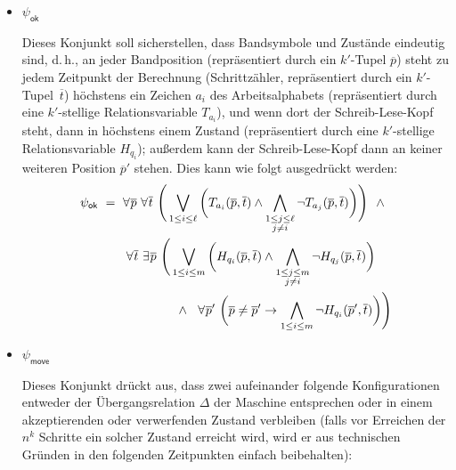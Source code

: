 \documentclass[fontsize=11pt, twoside=false, numbers=autoenddot]{scrbook}
\begin{document}
\begin{itemize}
  \item
    {\boldmath $\psi_{\textsf{ok}}$}
    \par
    Dieses Konjunkt soll sicherstellen,
    dass Bandsymbole und Zustände eindeutig sind, d.\,h.,
    an jeder Bandposition (repräsentiert durch ein $k'$-Tupel $\overline{p}$)
    steht zu jedem Zeitpunkt der Berechnung
    (Schrittzähler, repräsentiert durch ein $k'$-Tupel~$\overline{t}$)
    höchstens ein Zeichen $a_i$ des Arbeitsalphabets
    (repräsentiert durch eine $k'$-stellige Relationsvariable $T_{a_i}$),
    und wenn dort der Schreib-Lese-Kopf steht,
    dann in höchstens einem Zustand
    (repräsentiert durch eine $k'$-stellige Relationsvariable $H_{q_i}$);
    außerdem kann der Schreib-Lese-Kopf dann an keiner weiteren Position $\overline{p}'$ stehen.
    Dies kann wie folgt ausgedrückt werden:
    \begin{align*}
      \psi_{\textsf{ok}} & ~=~
      \forall\:\! \overline{p}~\forall\:\! \overline{t}~
      \Bigg(
        \bigvee_{1 \leq i \leq \ell} \bigg(
          T_{a_i}(\overline{p},\overline{t}) \land
          \bigwedge_{\substack{1 \leq j \leq \ell\\j \neq i}} \lnot T_{a_j}(\overline{p},\overline{t})
        \bigg)
      \Bigg)
      ~~\land \\
      & \hspace*{8mm}
      \forall\:\! \overline{t}~\exists\:\! \overline{p}~
      \Bigg(
        \bigvee_{1 \leq i \leq m} \bigg(
          H_{q_i}(\overline{p},\overline{t}) \land
          \bigwedge_{\substack{1 \leq j \leq m\\j \neq i}} \lnot H_{q_j}(\overline{p},\overline{t})
        \bigg)
      \\
      & \hspace*{22mm}
      \land~~ \forall\:\! \overline{p}'~
      \bigg(
        \overline{p} \neq \overline{p}' \to
        \bigwedge_{1 \leq i \leq m} \lnot H_{q_i}(\overline{p}',\overline{t})
      \bigg)\Bigg)
    \end{align*}
  \item
    {\boldmath $\psi_{\textsf{move}}$}
    \par
    Dieses Konjunkt drückt aus, dass zwei aufeinander folgende Konfigurationen
    entweder der Übergangsrelation $\Delta$ der Maschine entsprechen
    oder in einem akzeptierenden oder verwerfenden Zustand verbleiben
    (falls vor Erreichen der $n^k$ Schritte ein solcher Zustand erreicht wird,
    wird er aus technischen Gründen in den folgenden Zeitpunkten einfach beibehalten):

\end{itemize}
\end{document}
